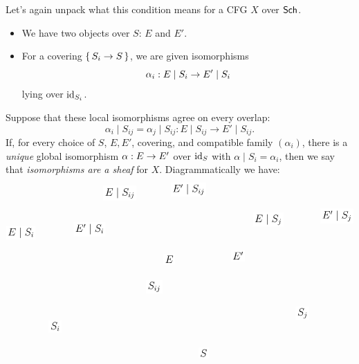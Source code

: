 \documentclass[12pt]{memoir}
\begin{document}
\begin{ptcb}
    Let's again unpack what this condition means for a CFG \(X\) over \(\mathsf{Sch}\).
    \begin{itemize}
        \item We have two objects over \(S\): \(E\) and \(E'\).
        \item For a covering \(\{\,S_i\to S\,\}\), we are given isomorphisms
        \[
            \al_i:E\mid S_i\to E'\mid S_i
        \]
        lying over \(\operatorname{id}_{S_i}\).
    \end{itemize}
    Suppose that these local isomorphisms agree on every overlap:
    \[
        \alpha_i\mid S_{ij}=\alpha_j\mid S_{ij}:
        E\mid S_{ij}\longrightarrow E'\mid S_{ij}.
    \]
    If, for every choice of \(S\), \(E,E'\), covering, and compatible family \((\alpha_i)\), there is a \emph{unique} global isomorphism \(\alpha:E\to E'\) over \(\operatorname{id}_S\) with \(\alpha\mid S_i=\alpha_i\), then we say that \emph{isomorphisms are a sheaf} for \(X\).
    Diagrammatically we have:
    \[
    \begin{tikzpicture}[
        x={(.665640cm,-.118600cm)},
        y={(.443760cm,.177900cm)},
        z={(0cm,.770899cm)},
        arrows={-{Latex[length=1.6mm]}},
        line width=.6pt,
        every node/.style={inner sep=2pt,font=\large},
        projection/.style={densely dotted,draw=gray!75},
        comparison/.style={draw=noteblue,line width=.8pt}
    ]
        \pgfdeclarelayer{isom-objects}
        \pgfsetlayers{main,isom-objects}
        \begin{pgfonlayer}{isom-objects}
        \node[fill=white] (Si)  at (1.25,1.25,-3) {$S_i$};
        \node[fill=white] (S)   at (10.25,1.25,-3) {$S$};
        \node[fill=white] (Sij) at (1.25,10.25,-3) {$S_{ij}$};
        \node[fill=white] (Sj)  at (10.25,10.25,-3) {$S_j$};

        \node[fill=white] (Bi) at (0,0,2) {$E\mid S_i$};
        \node[fill=white] (E)  at (9,0,2) {$E$};
        \node[fill=white] (A)  at (0,9,2) {$E\mid S_{ij}$};
        \node[fill=white] (Bj) at (9,9,2) {$E\mid S_j$};
        \node[fill=white] (Bip) at (2.5,2.5,2) {$E'\mid S_i$};
        \node[fill=white] (Ep)  at (11.5,2.5,2) {$E'$};
        \node[fill=white] (Ap)  at (2.5,11.5,2) {$E'\mid S_{ij}$};
        \node[fill=white] (Bjp) at (11.5,11.5,2) {$E'\mid S_j$};
        \end{pgfonlayer}


\end{tikzpicture}\]
\end{ptcb}
\end{document}
